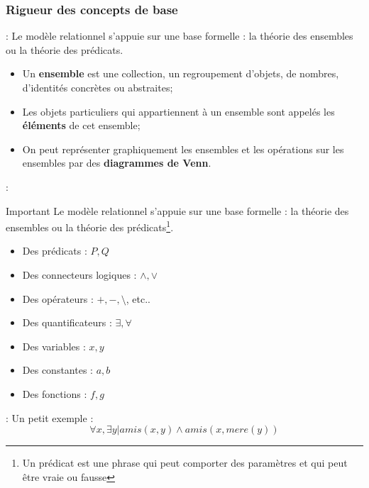 \documentclass[10pt]{beamer}
\begin{document}
\subsubsection{Rigueur des concepts de base}
\begin{frame}{\subsecname : \subsubsecname}
    Le modèle relationnel s’appuie sur une base formelle : la théorie des ensembles ou la théorie des prédicats.
    \begin{itemize}
        \item Un \textbf{ensemble} est une collection, un regroupement d’objets, de nombres, d’identités concrètes ou abstraites;
        \item Les objets particuliers qui appartiennent à un ensemble sont appelés les \textbf{éléments} de cet ensemble;
        \item On peut représenter graphiquement les ensembles et les opérations sur les ensembles par des \textbf{diagrammes de Venn}.
    \end{itemize}
\end{frame}

\begin{frame}{\subsecname : \subsubsecname}
    \begin{alertblock}{Important}
        Le modèle relationnel s’appuie sur une base formelle : la théorie des ensembles ou la théorie des prédicats\footnote{Un prédicat est une phrase qui peut comporter des paramètres et qui peut être vraie ou fausse}.
    \end{alertblock}
    \begin{itemize}
        \item Des prédicats : $P, Q$
        \item Des connecteurs logiques : $\land, \lor$
        \item Des opérateurs  : $+,-,\setminus$, etc..
        \item Des quantificateurs : $\exists, \forall$
        \item Des variables : $x,y$
        \item Des constantes : $a,b$
        \item Des fonctions : $f,g$
    \end{itemize}
\end{frame}

\begin{frame}{\subsecname : \subsubsecname}
    Un petit exemple :
    $$\forall x, \exists y | amis(x,y) \land amis(x,mere(y))$$
\end{frame}
\end{document}
